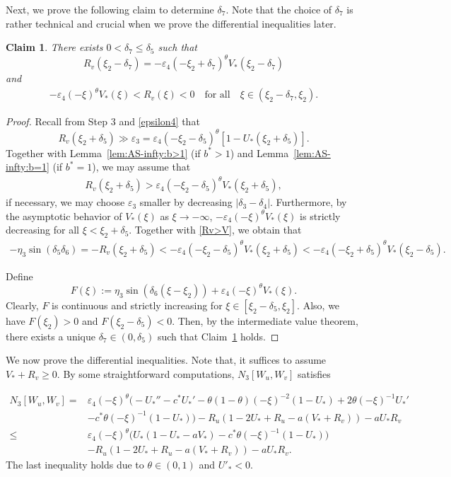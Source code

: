 \documentclass[11pt,a4paper]{article}
\newtheorem{claim}[theorem]{\textbf{Claim}}
\numberwithin{equation}{section}
\numberwithin{figure}{section}
\newcommand\bea{\begin{eqnarray}}
\newcommand\eea{\end{eqnarray}}
\newcommand\beaa{\begin{eqnarray*}}
\newcommand\eeaa{\end{eqnarray*}}
\begin{document}
Next, we prove the following claim to determine $\delta_7$.
Note that the choice of $\delta_7$ is rather technical and crucial when we prove the differential inequalities later.

\begin{claim}\label{cl 6}
There exists $0<\delta_7\le \delta_5$ such that 
$$R_v(\xi_2-\delta_7)=-\varepsilon_4(-\xi_2+\delta_7)^{\theta}V_*(\xi_2-\delta_7)$$ 
and
\bea\label{claim3.6}
-\varepsilon_4(-\xi)^{\theta}V_*(\xi)<R_v(\xi)<0\quad\text{for all}\quad \xi\in(\xi_2-\delta_7,\xi_2).
\eea
\end{claim}
\begin{proof}
Recall from Step 3 and \eqref{epsilon4}
that 
$$R_v(\xi_2+\delta_5)\gg \varepsilon_3=\varepsilon_4(-\xi_2-\delta_5)^{\theta}[1-U_*(\xi_2+\delta_5)].$$
Together with Lemma~\ref{lem:AS-infty:b>1} (if $b^*>1$) and Lemma~\ref{lem:AS-infty:b=1} (if $b^*=1$), we may assume that
\bea\label{Rv>V}
R_v(\xi_2+\delta_5)>\varepsilon_4(-\xi_2-\delta_5)^{\theta}V_*(\xi_2+\delta_5),
\eea
if necessary, we may choose $\varepsilon_3$ smaller by decreasing $|\delta_3-\delta_4|$.
Furthermore, by the asymptotic behavior of $V_*(\xi)$ as $\xi\to -\infty$,  $-\varepsilon_4(-\xi)^{\theta}V_*(\xi)$ is strictly decreasing for all $\xi<\xi_2+\delta_5$.  Together with \eqref{Rv>V}, we obtain that
\beaa
-\eta_3\sin(\delta_5\delta_6)=-R_v(\xi_2+\delta_5)<
-\varepsilon_4(-\xi_2-\delta_5)^{\theta}V_*(\xi_2+\delta_5)<-\varepsilon_4(-\xi_2+\delta_5)^{\theta}V_*(\xi_2-\delta_5).
\eeaa

Define $$F(\xi):=\eta_3\sin(\delta_6(\xi-\xi_2))+\varepsilon_4(-\xi)^{\theta}V_*(\xi).$$
Clearly, $F$ is continuous and strictly increasing for $\xi\in[\xi_2-\delta_5,\xi_2]$. Also,
we have $F(\xi_2)>0$ and $F(\xi_2-\delta_5)<0$.
Then, by the intermediate value theorem, there exists a unique $\delta_7\in(0,\delta_5)$ such that Claim~\ref{cl 6} holds.
\end{proof}


We now prove the differential inequalities.
Note that, it suffices to assume $V_*+R_v\ge0$.
By some straightforward computations, $N_3[W_u,W_v]$ satisfies

\begin{equation}\label{N3 inequalifty -infty}
\begin{aligned}
N_3[W_u,W_v]=&\varepsilon_4(-\xi)^{\theta}\Big(-U_*''-c^*U_*'-\theta(1-\theta)(-\xi)^{-2}(1-U_*)+2\theta(-\xi)^{-1}U_*'\\&-c^*\theta(-\xi)^{-1}(1-U_*)\Big)
-R_u(1-2U_*+R_u-a(V_*+R_v))-aU_*R_v\\
\leq&\varepsilon_4(-\xi)^{\theta}\Big(U_*(1-U_*-aV_*)-c^*\theta(-\xi)^{-1}(1-U_*)\Big)\\&-R_u(1-2U_*+R_u-a(V_*+R_v))-aU_*R_v.
\end{aligned}
\end{equation}
The last inequality holds due to $\theta\in(0,1)$ and $U'_*<0$.
\end{document}
